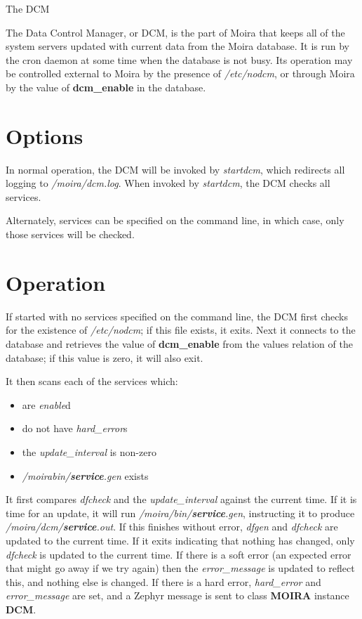 
\begin{center}
{\Large The DCM}
\end{center}

The Data Control Manager, or DCM, is the part of Moira that keeps all
of the system servers updated with current data from the Moira
database. It is run by the cron daemon at some time when the database
is not busy. Its operation may be controlled external to Moira by the
presence of {\it /etc/nodcm}, or through Moira by the value of {\bf
dcm\_enable} in the database.

\section{Options}

In normal operation, the DCM will be invoked by {\it startdcm}, which
redirects all logging to {\it /moira/dcm.log}. When invoked by {\it
startdcm}, the DCM checks all services.

Alternately, services can be specified on the command line, in which
case, only those services will be checked.

\section{Operation}

If started with no services specified on the command line, the DCM
first checks for the existence of {\it /etc/nodcm}; if this file
exists, it exits. Next it connects to the database and retrieves the
value of {\bf dcm\_enable} from the values relation of the database; if
this value is zero, it will also exit.

It then scans each of the services which:

\begin{itemize}
\item are {\it enable\/}d
\item do not have {\it hard\_error\/}s
\item the {\it update\_interval\/} is non-zero
\item {\it /moirabin/{\bf service}.gen\/} exists
\end{itemize}

It first compares {\it dfcheck\/} and the {\it update\_interval\/}
against the current time. If it is time for an update, it will run
{\it /moira/bin/{\bf service}.gen}, instructing it to produce {\it
/moira/dcm/{\bf service}.out}. If this finishes without error, {\it
dfgen} and {\it dfcheck} are updated to the current time. If it exits
indicating that nothing has changed, only {\it dfcheck} is updated to
the current time. If there is a soft error (an expected error that
might go away if we try again) then the {\it error\_message} is
updated to reflect this, and nothing else is changed. If there is a
hard error, {\it hard\_error} and {\it error\_message} are set, and a
Zephyr message is sent to class {\bf MOIRA} instance {\bf DCM}.

